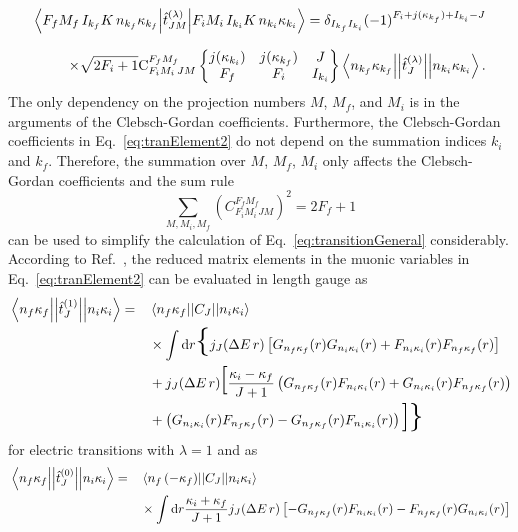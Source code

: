\begin{alignat}{2}
\left<F_fM_f\,I_{k_f}K\,n_{k_f}\kappa_{k_f} \middle|\hat{t}^{(\lambda)}_{JM}\middle|F_iM_i\,I_{k_i}K\,n_{k_i}\kappa_{k_i}\right>=\delta_{I_{k_f}I_{k_i}}(-1)^{F_i+j(\kappa_{k_f})+I_{k_i}-J}
\notag\\[7.5pt]
\times\sqrt{2F_i+1}\text{C}^{F_fM_f}_{F_iM_i\,JM}
\begin{Bmatrix}
j(\kappa_{k_i})&j(\kappa_{k_f})&J\\
F_f&F_i&I_{k_i}
\end{Bmatrix}
\left< n_{k_f}\kappa_{k_f}\middle|\middle|\hat{t}^{(\lambda)}_{J}\middle|\middle|n_{k_i}\kappa_{k_i}\right>.
\label{eq:tranElement2}
\end{alignat}
The only dependency on the projection numbers $M$, $M_f$, and $M_i$ is in the arguments of the Clebsch-Gordan coefficients.
Furthermore, the Clebsch-Gordan coefficients in Eq.~\eqref{eq:tranElement2} do not depend on the summation indices $k_i$ and $k_f$.
Therefore, the summation over $M$, $M_f$, $M_i$ only affects the Clebsch-Gordan coefficients and the sum rule~\cite{varshalovich1988}
\begin{equation}
\sum_{M,M_i,M_f}\left(C^{F_fM_f}_{F_iM_i\,JM}\right)^2 = 2F_f+1
\end{equation}
can be used to simplify the calculation of Eq.~\eqref{eq:transitionGeneral} considerably. According to Ref.~\cite{johnson2007}, the reduced matrix elements in the muonic variables in Eq.~\eqref{eq:tranElement2} can be evaluated in length gauge as
\begin{alignat}{2}
\label{eq:relElTrans}
&\left< n_{f}\kappa_{f}\middle|\middle|\hat{t}^{(1)}_{J}\middle|\middle|n_{i}\kappa_{i}\right>=&&
\left<n_f\kappa_f\middle|\middle|C_J\middle|\middle|n_i\kappa_i\right>\\
&&&\times\int\text{d}r \text{\huge\{}j_J(\Delta E\,r)\left[G_{n_f\kappa_f}(r)G_{n_i\kappa_i}(r)+F_{n_i\kappa_i}(r)F_{n_f\kappa_f}(r)\right]\\
&&& +j_J(\Delta E\,r)\text{\huge[}\frac{\kappa_i-\kappa_f}{J+1}
\left(G_{n_f\kappa_f}(r)F_{n_i\kappa_i}(r)+G_{n_i\kappa_i}(r)F_{n_f\kappa_f}(r)\right)\\
&&& +\left(G_{n_i\kappa_i}(r)F_{n_f\kappa_f}(r)-G_{n_f\kappa_f}(r)F_{n_i\kappa_i}(r)\right)
 \text{\huge]}\text{\huge\}}
\end{alignat}
for electric transitions with $\lambda= 1 $ and as
\begin{alignat}{2}
&\left< n_{f}\kappa_{f}\middle|\middle|\hat{t}^{(0)}_{J}\middle|\middle|n_{i}\kappa_{i}\right>=&&
\left<n_f\,({-}{\kappa_f})\middle|\middle|C_J\middle|\middle|n_i\kappa_i\right>\notag\\
&&&\times\int\text{d}r\frac{\kappa_i+\kappa_f}{J+1}j_J(\Delta E\,r)\left[-G_{n_f\kappa_f}(r)F_{n_i\kappa_i}(r)-F_{n_f\kappa_f}(r)G_{n_i\kappa_i}(r)\right]
\end{alignat}
